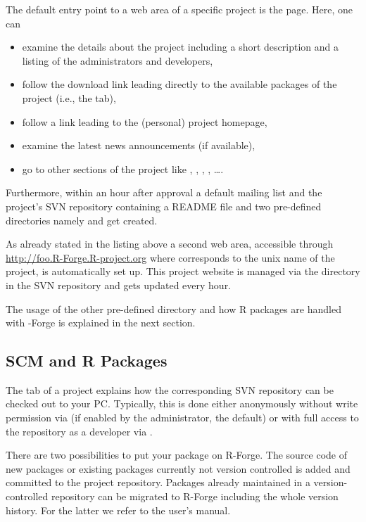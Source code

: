 The default entry point to a web area of a specific project is
the  page. Here, one can 

\begin{itemize}
\item examine the details about the project including a short
  description and a listing of the administrators and developers,
\item follow the download link leading directly to the available packages
  of the project (i.e., the  tab),
\item follow a link leading to the (personal) project homepage,
\item examine the latest news announcements (if available),
\item go to other sections of the project like
  , ,
   , , \ldots{}.
\end{itemize}

Furthermore, within an hour after approval a default mailing list and
the project's SVN repository containing a README file and two
pre-defined directories namely  and  get created. 

As already stated in the listing above a second web area, accessible 
through \url{http://foo.R-Forge.R-project.org} where 
corresponds to the unix name of the project, is automatically
set up. This project website is managed via the  directory
in the SVN repository and gets updated every hour.

The usage of the other pre-defined directory  and how R
packages are handled with \R-Forge is explained in the next
section.


\subsection{SCM and R Packages}

The  tab of a project explains how the corresponding SVN
repository can be checked out to your PC. Typically, this is done either
anonymously without write permission via  (if enabled by the
administrator, the default) or with full access to the repository as a
developer via . 

There are two possibilities to put your package on R-Forge. The source
code of new packages or existing packages currently not version
controlled is added and committed to the project repository. Packages
already maintained in a version-controlled repository can be migrated
to R-Forge including the whole version history. For the latter we 
refer to the user's manual. 

